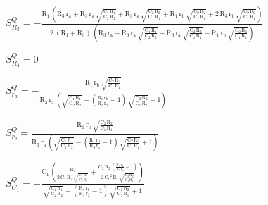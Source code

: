 \documentclass[../tc_tpfinal_main.tex]{subfiles}
\begin{document}
$S^{Q}_{R_3} = -\frac{\mathrm{R_1}\, \left(\mathrm{R_3}\, \mathrm{r_a} + \mathrm{R_3}\, \mathrm{r_a}\, \sqrt{\frac{\mathrm{C_1}\, \mathrm{R_1}}{\mathrm{C_2}\, \mathrm{R_2}}} + \mathrm{R_3}\, \mathrm{r_a}\, \sqrt{\frac{\mathrm{C_2}\, \mathrm{R_2}}{\mathrm{C_1}\, \mathrm{R_1}}} + \mathrm{R_1}\, \mathrm{r_b}\, \sqrt{\frac{\mathrm{C_2}\, \mathrm{R_2}}{\mathrm{C_1}\, \mathrm{R_1}}} + 2\, \mathrm{R_3}\, \mathrm{r_b}\, \sqrt{\frac{\mathrm{C_2}\, \mathrm{R_2}}{\mathrm{C_1}\, \mathrm{R_1}}}\right)}{2\, \left(\mathrm{R_1} + \mathrm{R_3}\right)\, \left(\mathrm{R_3}\, \mathrm{r_a} + \mathrm{R_3}\, \mathrm{r_a}\, \sqrt{\frac{\mathrm{C_1}\, \mathrm{R_1}}{\mathrm{C_2}\, \mathrm{R_2}}} + \mathrm{R_3}\, \mathrm{r_a}\, \sqrt{\frac{\mathrm{C_2}\, \mathrm{R_2}}{\mathrm{C_1}\, \mathrm{R_1}}} - \mathrm{R_1}\, \mathrm{r_b}\, \sqrt{\frac{\mathrm{C_2}\, \mathrm{R_2}}{\mathrm{C_1}\, \mathrm{R_1}}}\right)}$\par

$S^{Q}_{R_4} = 0$\par

$S^{Q}_{r_a} = -\frac{\mathrm{R_1}\, \mathrm{r_b}\, \sqrt{\frac{\mathrm{C_2}\, \mathrm{R_2}}{\mathrm{C_1}\, \mathrm{R_1}}}}{\mathrm{R_3}\, \mathrm{r_a}\, \left(\sqrt{\frac{\mathrm{C_1}\, \mathrm{R_1}}{\mathrm{C_2}\, \mathrm{R_2}}} - \left(\frac{\mathrm{R_1}\, \mathrm{r_b}}{\mathrm{R_3}\, \mathrm{r_a}} - 1\right)\, \sqrt{\frac{\mathrm{C_2}\, \mathrm{R_2}}{\mathrm{C_1}\, \mathrm{R_1}}} + 1\right)}$\par

$S^{Q}_{r_b} = \frac{\mathrm{R_1}\, \mathrm{r_b}\, \sqrt{\frac{\mathrm{C_2}\, \mathrm{R_2}}{\mathrm{C_1}\, \mathrm{R_1}}}}{\mathrm{R_3}\, \mathrm{r_a}\, \left(\sqrt{\frac{\mathrm{C_1}\, \mathrm{R_1}}{\mathrm{C_2}\, \mathrm{R_2}}} - \left(\frac{\mathrm{R_1}\, \mathrm{r_b}}{\mathrm{R_3}\, \mathrm{r_a}} - 1\right)\, \sqrt{\frac{\mathrm{C_2}\, \mathrm{R_2}}{\mathrm{C_1}\, \mathrm{R_1}}} + 1\right)}$\par

$S^{Q}_{C_1} = -\frac{\mathrm{C_1}\, \left(\frac{\mathrm{R_1}}{2\, \mathrm{C_2}\, \mathrm{R_2}\, \sqrt{\frac{\mathrm{C_1}\, \mathrm{R_1}}{\mathrm{C_2}\, \mathrm{R_2}}}} + \frac{\mathrm{C_2}\, \mathrm{R_2}\, \left(\frac{\mathrm{R_1}\, \mathrm{r_b}}{\mathrm{R_3}\, \mathrm{r_a}} - 1\right)}{2\, {\mathrm{C_1}}^2\, \mathrm{R_1}\, \sqrt{\frac{\mathrm{C_2}\, \mathrm{R_2}}{\mathrm{C_1}\, \mathrm{R_1}}}}\right)}{\sqrt{\frac{\mathrm{C_1}\, \mathrm{R_1}}{\mathrm{C_2}\, \mathrm{R_2}}} - \left(\frac{\mathrm{R_1}\, \mathrm{r_b}}{\mathrm{R_3}\, \mathrm{r_a}} - 1\right)\, \sqrt{\frac{\mathrm{C_2}\, \mathrm{R_2}}{\mathrm{C_1}\, \mathrm{R_1}}} + 1}$\par
\end{document}
